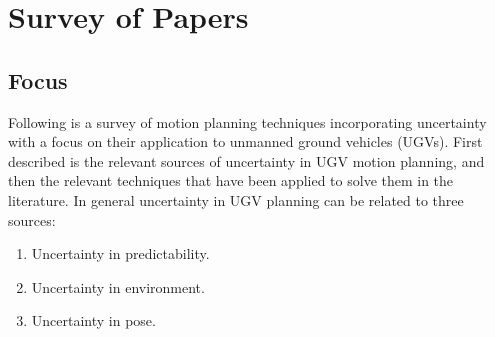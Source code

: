 \chapter{Survey of Papers}
\label{chp:survey-of-papers}

\section{Focus}
Following is a survey of motion planning techniques incorporating uncertainty
with a focus on their application to unmanned ground vehicles (UGVs). First
described is the relevant sources of uncertainty in UGV motion planning, and
then the relevant techniques that have been applied to solve them in the
literature. In general uncertainty in UGV planning can be related to three
sources:
\begin{enumerate}
\item Uncertainty in predictability.
\item Uncertainty in environment.
\item Uncertainty in pose.
\end{enumerate}~\cite{lavalleFrameworkMotionPlanning1995}

